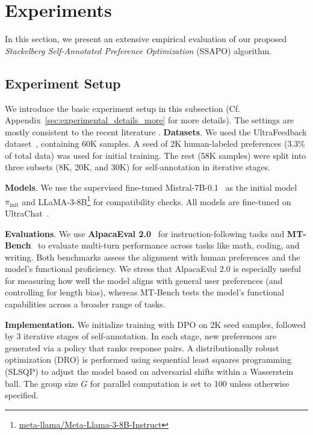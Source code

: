 \section{Experiments}
\label{sec:experiments}
In this section, we present an extensive empirical evaluation of our proposed \emph{Stackelberg Self-Annotated Preference Optimization} (SSAPO) algorithm.
\subsection{Experiment Setup}
We introduce the basic experiment setup in this subsection (Cf. Appendix~\ref{sec:experimental_details_more} for more details). The settings are mostly consistent to the recent literature \citet{Kim2025Spread}.
\textbf{Datasets}. We used the UltraFeedback dataset~\cite{Cui2023Ultrafeedback}, containing 60K samples. A seed of 2K human-labeled preferences (3.3\% of total data) was used for initial training. The rest (58K samples) were split into three subsets (8K, 20K, and 30K) for self-annotation in iterative stages.

\textbf{Models}.
We use the supervised fine-tuned Mistral-7B-0.1~\cite{jiang2023mistral} as the initial model $\pi_{\text{init}}$ and LLaMA-3-8B\footnote{\href{https://huggingface.co/meta-llama/Meta-Llama-3-8B-Instruct}{meta-llama/Meta-Llama-3-8B-Instruct}} for compatibility checks. All models are fine-tuned on UltraChat~\cite{ding2023enhancing}.

\textbf{Evaluations}.
We use \textbf{AlpacaEval 2.0}~\cite{dubois2024alpacafarm} for instruction-following tasks and \textbf{MT-Bench}~\cite{zheng2023judging} to evaluate multi-turn performance across tasks like math, coding, and writing. Both benchmarks assess the alignment with human preferences and the model’s functional proficiency. We stress that AlpacaEval 2.0 is especially useful for measuring how well the model aligns with general user preferences (and controlling for length bias), whereas MT-Bench tests the model’s functional capabilities across a broader range of tasks.

\textbf{Implementation.}
We initialize training with DPO on 2K seed samples, followed by 3 iterative stages of self-annotation. In each stage, new preferences are generated via a policy that ranks response pairs. A distributionally robust optimization (DRO) is performed using sequential least squares programming (SLSQP) to adjust the model based on adversarial shifts within a Wasserstein ball. The group size $G$ for parallel computation is set to 100 unless otherwise specified.

